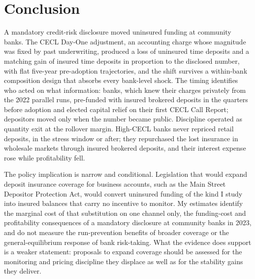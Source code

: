 \section{Conclusion}
\label{sec:conclusion}

A mandatory credit-risk disclosure moved uninsured funding at community
banks.  The CECL Day-One adjustment, an accounting charge whose
magnitude was fixed by past underwriting, produced a loss of uninsured
time deposits and a matching gain of insured time deposits in
proportion to the disclosed number, with flat five-year pre-adoption
trajectories, and the shift survives a within-bank composition design
that absorbs every bank-level shock.  The timing identifies who acted
on what information: banks, which knew their charges privately from
the 2022 parallel runs, pre-funded with insured brokered deposits in
the quarters before adoption and elected capital relief on their first
CECL Call Report; depositors moved only when the number became
public.  Discipline operated as quantity exit at the
rollover margin.  High-CECL banks never repriced retail deposits, in
the stress window or after; they repurchased the lost insurance in
wholesale markets through insured brokered deposits, and their
interest expense rose while profitability fell.

The policy implication is narrow and conditional.  Legislation that
would expand deposit insurance coverage for business accounts, such as
the Main Street Depositor Protection Act, would convert uninsured
funding of the kind I study into insured balances that carry no
incentive to monitor.  My estimates identify the marginal cost of that
substitution on one channel only, the funding-cost and profitability
consequences of a mandatory disclosure at community banks in 2023, and
do not measure the run-prevention benefits of broader coverage or the
general-equilibrium response of bank risk-taking.  What the evidence
does support is a weaker statement: proposals to expand coverage
should be assessed for the monitoring and pricing discipline they
displace as well as for the stability gains they deliver.
